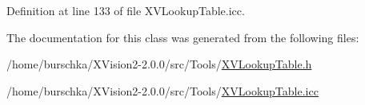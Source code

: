 Definition at line 133 of file XVLookup\-Table.icc.

The documentation for this class was generated from the following files:\begin{CompactItemize}
\item 
/home/burschka/XVision2-2.0.0/src/Tools/\hyperlink{XVLookupTable.h-source}{XVLookup\-Table.h}\item 
/home/burschka/XVision2-2.0.0/src/Tools/\hyperlink{XVLookupTable.icc-source}{XVLookup\-Table.icc}\end{CompactItemize}
